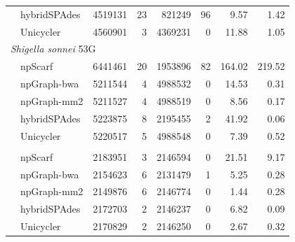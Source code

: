 \documentclass[10pt,twocolumn,twoside]{genpaper}
\begin{document}
\begin{longtable}[!hpt]{llcrrrrr}
\rowcolor{Gray}
& hybridSPAdes &  4519131 & 23   &  821249  & 96   & 9.57  &  1.42\\*
\rowcolor{Gray}
& Unicycler & 4560901  & 3   &  4369231  &  0  & 11.88  & 1.05 \\
\hline
\multicolumn{8}{l}{\emph{Shigella sonnei} 53G} \\* %
\nobreakmidrule
& npScarf &  6441461 &  20  &  1953896  &  82  & 164.02  &  219.52\\*
& npGraph-bwa & 5211544  &   4 &  4988532  & 0  & 14.53  &  0.31\\*
& npGraph-mm2 & 5211527  &  4  &   4988519 & 0  &  8.56 &  0.17\\*
& hybridSPAdes & 5223875  &  8  &  2195455  &  2  & 41.92  & 0.06\\*
& Unicycler &  5220517 &  5 &  4988548 & 0  & 7.39  &  0.52\\
\hline
\rowcolor{Gray}
\multicolumn{8}{l}{\emph{Streptococcus suis} BM407} \\* %
\nobreakmidrule
\rowcolor{Gray}
& npScarf &  2183951 & 3   &  2146594  &  0  & 21.51  & 9.17\\*
\rowcolor{Gray}
& npGraph-bwa & 2154623  &  6  &  2131479  &  1  & 5.25  & 0.28\\*
\rowcolor{Gray}
& npGraph-mm2 & 2149876  &  6  &  2146774  &  0  & 1.44  & 0.28\\*
\rowcolor{Gray}
& hybridSPAdes & 2172703  &  2  &  2146237  &  0  & 6.82  &  0.09\\*
\rowcolor{Gray}
& Unicycler &  2170829 &   2 &  2146250  &  0  &  2.67 & 0.32 \\
\hline
\end{longtable}
\end{document}

